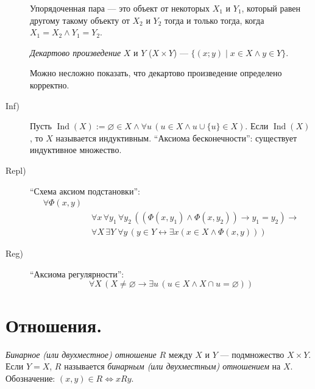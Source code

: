 \documentclass[12pt,a4paper]{article}
\DeclareMathOperator{\Ind}{Ind}
\newcommand{\ZF}{\ensuremath{\mathrm{ZF}}\xspace}
\newcommand{\ZFC}{\ensuremath{\mathrm{ZFC}}\xspace}
\begin{document}
\begin{definition}[аксиомы \ZFC (= \ZF (аксиомы Цермело-Френкеля) + C (аксиома выбора))]
\begin{description}
                \begin{definition}
                    Упорядоченная пара --- это объект от некоторых $X_1$ и $Y_1$, который равен другому такому объекту от $X_2$ и $Y_2$ тогда и только тогда, когда $X_1 = X_2 \wedge Y_1 = Y_2$.
                \end{definition}

                \begin{definition}
                    \emph{Декартово произведение} $X$ и $Y$ ($X \times Y$) --- $\{(x; y) \mid x \in X \wedge y \in Y\}$. 
                \end{definition}

                \begin{remark}
                    Можно несложно показать, что декартово произведение определено корректно.
                \end{remark}
            \item[Inf)] Пусть $\Ind(X) := \varnothing \in X \wedge \forall u\, (u \in X \wedge u \cup \{u\} \in X)$. Если $\Ind(X)$, то $X$ называется индуктивным. ``Аксиома бесконечности'': существует индуктивное множество.
            \item[Repl)] ``Схема аксиом подстановки'':
                \begin{align*}
                    \forall \Phi(x, y)\;&\\
                    &\forall x\, \forall y_1\, \forall y_2\, ((\Phi(x, y_1) \wedge \Phi(x, y_2)) \rightarrow y_1 = y_2) \rightarrow\\
                    &\forall X\, \exists Y\; \forall y\, (y \in Y \leftrightarrow \exists x (x \in X \wedge \Phi(x, y)))
                \end{align*}
            \item[Reg)] ``Аксиома регулярности'':
                \[
                    \forall X\, (X\neq \varnothing \rightarrow \exists u\, (u\in X \wedge X \cap u = \varnothing))
                \]
        \end{description}
    \end{definition}

    \section{Отношения.}

    \begin{definition}
        \emph{Бинарное (или двухместное) отношение} $R$ между $X$ и $Y$ --- подмножество $X \times Y$. Если $Y = X$, $R$ называется \emph{бинарным (или двухместным) отношением} на $X$.\\
        Обозначение: $(x, y) \in R \Leftrightarrow xRy$.
    \end{definition}
\end{document}
